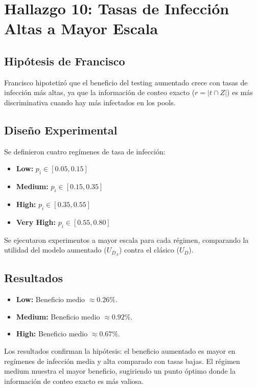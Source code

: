 \documentclass[11pt, a4paper]{article}
\begin{document}
\section{Hallazgo 10: Tasas de Infecci\'on Altas a Mayor Escala}

\subsection{Hip\'otesis de Francisco}
Francisco hipotetiz\'o que el beneficio del testing aumentado crece con tasas
de infecci\'on m\'as altas, ya que la informaci\'on de conteo exacto
($r = |t \cap Z|$) es m\'as discriminativa cuando hay m\'as infectados en
los pools.

\subsection{Dise\~no Experimental}
Se definieron cuatro reg\'imenes de tasa de infecci\'on:
\begin{itemize}[nosep]
    \item \textbf{Low:} $p_i \in [0.05, 0.15]$
    \item \textbf{Medium:} $p_i \in [0.15, 0.35]$
    \item \textbf{High:} $p_i \in [0.35, 0.55]$
    \item \textbf{Very High:} $p_i \in [0.55, 0.80]$
\end{itemize}

Se ejecutaron experimentos a mayor escala para cada r\'egimen, comparando
la utilidad del modelo aumentado ($U_{D_A}$) contra el cl\'asico ($U_D$).

\subsection{Resultados}
\begin{itemize}[nosep]
    \item \textbf{Low:} Beneficio medio $\approx 0.26\%$.
    \item \textbf{Medium:} Beneficio medio $\approx 0.92\%$.
    \item \textbf{High:} Beneficio medio $\approx 0.67\%$.
\end{itemize}

Los resultados confirman la hip\'otesis: el beneficio aumentado es mayor en
reg\'imenes de infecci\'on media y alta comparado con tasas bajas. El
r\'egimen medium muestra el mayor beneficio, sugiriendo un punto \'optimo
donde la informaci\'on de conteo exacto es m\'as valiosa.
\end{document}
